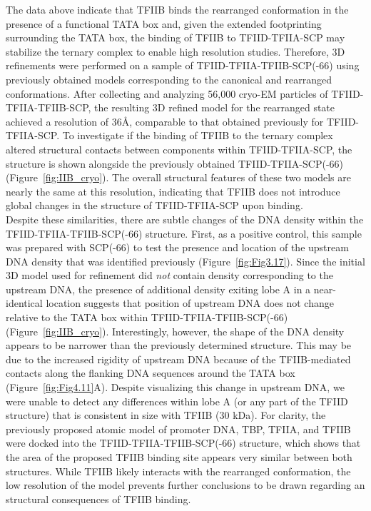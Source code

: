 \indent The data above indicate that TFIIB binds the rearranged conformation in the presence of a functional TATA box and, given the extended footprinting surrounding the TATA box, the binding of TFIIB to TFIID-TFIIA-SCP may stabilize the ternary complex to enable high resolution studies. Therefore, 3D refinements were performed on a sample of TFIID-TFIIA-TFIIB-SCP(-66) using previously obtained models corresponding to the canonical and rearranged conformations. After collecting and analyzing 56,000 cryo-EM particles of TFIID-TFIIA-TFIIB-SCP, the resulting 3D refined model for the rearranged state achieved a resolution of 36\AA, comparable to that obtained previously for TFIID-TFIIA-SCP. To investigate if the binding of TFIIB to the ternary complex altered structural contacts between components within TFIID-TFIIA-SCP, the structure is shown alongside the previously obtained TFIID-TFIIA-SCP(-66) (Figure~\ref{fig:IIB_cryo}). The overall structural features of these two models are nearly the same at this resolution, indicating that TFIIB does not introduce global changes in the structure of TFIID-TFIIA-SCP upon binding. \\
\indent Despite these similarities, there are subtle changes of the DNA density within the TFIID-TFIIA-TFIIB-SCP(-66) structure. First, as a positive control, this sample was prepared with SCP(-66) to test the presence and location of the upstream DNA density that was identified previously (Figure~\ref{fig:Fig3.17}). Since the initial 3D model used for refinement did \emph{not} contain density corresponding to the upstream DNA, the presence of additional density exiting lobe A in a near-identical location suggests that position of upstream DNA does not change relative to the TATA box within TFIID-TFIIA-TFIIB-SCP(-66) (Figure~\ref{fig:IIB_cryo}). Interestingly, however, the shape of the DNA density appears to be narrower than the previously determined structure. This may be due to the increased rigidity of upstream DNA because of the TFIIB-mediated contacts along the flanking DNA sequences around the TATA box (Figure~\ref{fig:Fig4.11}A). Despite visualizing this change in upstream DNA, we were unable to detect any differences within lobe A (or any part of the TFIID structure) that is consistent in size with TFIIB (30 kDa). For clarity, the previously proposed atomic model of promoter DNA, TBP, TFIIA, and TFIIB were docked into the TFIID-TFIIA-TFIIB-SCP(-66) structure, which shows that the area of the proposed TFIIB binding site appears very similar between both structures. While TFIIB likely interacts with the rearranged conformation, the low resolution of the model prevents further conclusions to be drawn regarding an structural consequences of TFIIB binding. \\
